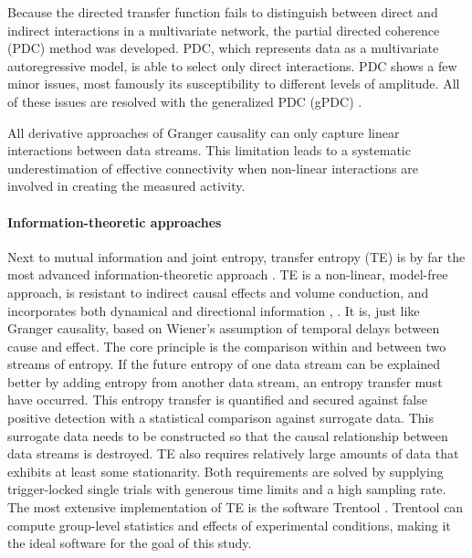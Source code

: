 Because the directed transfer function fails to distinguish between direct and indirect interactions in a multivariate network, the partial directed coherence (PDC) method was developed.
PDC, which represents data as a multivariate autoregressive model, is able to select only direct interactions.
PDC shows a few minor issues, most famously its susceptibility to different levels of amplitude.
All of these issues are resolved with the generalized PDC (gPDC) \cite{1.5.gPDC}.

All derivative approaches of Granger causality can only capture linear interactions between data streams.
This limitation leads to a systematic underestimation of effective connectivity when non-linear interactions are involved in creating the measured activity.

\paragraph{Information-theoretic approaches}
Next to mutual information and joint entropy, transfer entropy (TE) is by far the most advanced information-theoretic approach \cite{1.5.TEcomparison}.
TE is a non-linear, model-free approach, is resistant to indirect causal effects and volume conduction, and incorporates both dynamical and directional information \cite{3.4.TE.a}, \cite{3.4.TE.b}.
It is, just like Granger causality, based on Wiener's assumption of temporal delays between cause and effect.
The core principle is the comparison within and between two streams of entropy.
If the future entropy of one data stream can be explained better by adding entropy from another data stream, an entropy transfer must have occurred.
This entropy transfer is quantified and secured against false positive detection with a statistical comparison against surrogate data.
This surrogate data needs to be constructed so that the causal relationship between data streams is destroyed.
TE also requires relatively large amounts of data that exhibits at least some stationarity.
Both requirements are solved by supplying trigger-locked single trials with generous time limits and a high sampling rate.
The most extensive implementation of TE is the software Trentool \cite{3.4.Trentool}.
Trentool can compute group-level statistics and effects of experimental conditions, making it the ideal software for the goal of this study.

